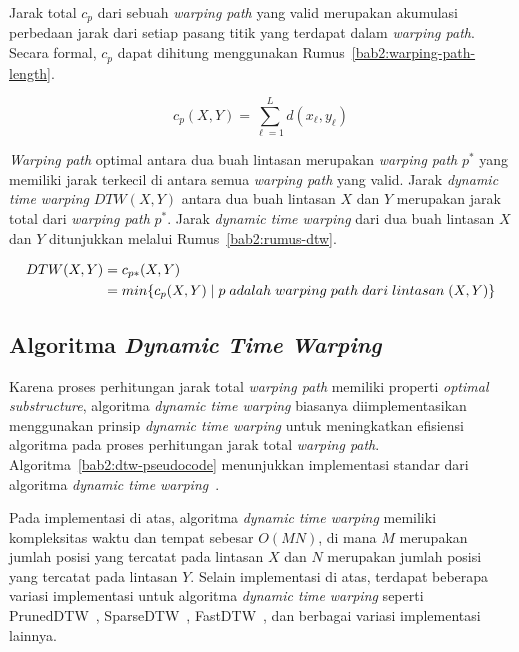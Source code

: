 Jarak total $c_p$ dari sebuah \textit{warping path} yang valid merupakan akumulasi perbedaan jarak dari setiap pasang titik yang terdapat dalam \textit{warping path}. Secara formal, $c_p$ dapat dihitung menggunakan Rumus~\ref{bab2:warping-path-length}.

\begin{equation}
    c_p(X, Y) = \sum_{\ell = 1}^{L} d(x_\ell, y_\ell)
    \label{bab2:warping-path-length}
\end{equation}

\textit{Warping path} optimal antara dua buah lintasan merupakan \textit{warping path} $p^*$ yang memiliki jarak terkecil di antara semua \textit{warping path} yang valid. Jarak \textit{dynamic time warping} $DTW(X, Y)$ antara dua buah lintasan $X$ dan $Y$ merupakan jarak total dari \textit{warping path} $p^*$. Jarak \textit{dynamic time warping} dari dua buah lintasan $X$ dan $Y$ ditunjukkan melalui Rumus~\ref{bab2:rumus-dtw}.

\begin{equation}
    \begin{aligned}
        DTW(X, Y) & = c\textsubscript{$p*$}(X, Y) \\
        & = min\{c_p(X, Y)\;|\;p\;adalah\;warping\;path\;dari\;lintasan\;(X, Y)\}
    \end{aligned}
    \label{bab2:rumus-dtw}
\end{equation}

\subsection{Algoritma \textit{Dynamic Time Warping}}
\label{subsec:algoritma-dtw}

Karena proses perhitungan jarak total \textit{warping path} memiliki properti \textit{optimal substructure}, algoritma \textit{dynamic time warping} biasanya diimplementasikan menggunakan prinsip \textit{dynamic time warping} untuk meningkatkan efisiensi algoritma pada proses perhitungan jarak total \textit{warping path}. Algoritma~\ref{bab2:dtw-pseudocode} menunjukkan implementasi standar dari algoritma \textit{dynamic time warping}~\cite{senin:02:dtw}.

Pada implementasi di atas, algoritma \textit{dynamic time warping} memiliki kompleksitas waktu dan tempat sebesar $O(MN)$, di mana $M$ merupakan jumlah posisi yang tercatat pada lintasan $X$ dan $N$ merupakan jumlah posisi yang tercatat pada lintasan $Y$. Selain implementasi di atas, terdapat beberapa variasi implementasi untuk algoritma \textit{dynamic time warping} seperti PrunedDTW~\cite{diego:02:pruned-dtw}, SparseDTW~\cite{ghazi:02:sparse-dtw}, FastDTW~\cite{salvador:02:fast-dtw}, dan berbagai variasi implementasi lainnya.


